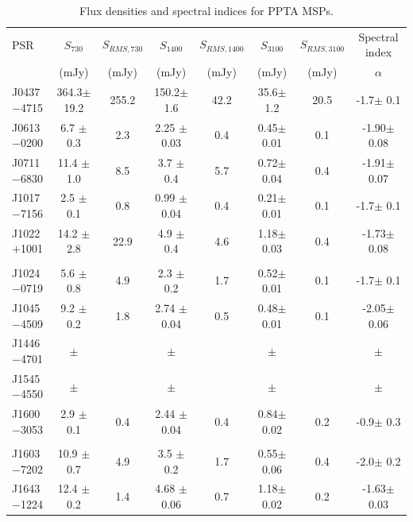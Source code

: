 \documentclass[useAMS,usenatbib]{mn2e}
\begin{document}
\begin{table}
\centering
\caption{Flux densities and spectral indices for PPTA MSPs.}
\label{tableFlux}
\begin{tabular}{lccccccc}
\hline
PSR              &    $S_{730}$   &   $S_{RMS,730}$  &    $S_{1400}$    &   $S_{RMS,1400}$  &    $S_{3100}$    &   $S_{RMS,3100}$  & Spectral index \\
								 &     (mJy)      &      (mJy)       &     (mJy)        &      (mJy)       &      (mJy)       &      (mJy)       &     $\alpha$   \\
\hline
 J0437$-$4715  &  364.3$\pm$ 19.2 &  255.2 &  150.2$\pm$ 1.6  &  42.2 &  35.6$\pm$ 1.2  &  20.5 &  -1.7$\pm$ 0.1    \\
 J0613$-$0200  &  6.7  $\pm$ 0.3  &  2.3   &  2.25 $\pm$ 0.03 &  0.4  &  0.45$\pm$ 0.01 &  0.1  &  -1.90$\pm$ 0.08    \\
 J0711$-$6830  &  11.4 $\pm$ 1.0  &  8.5   &  3.7  $\pm$ 0.4  &  5.7  &  0.72$\pm$ 0.04 &  0.4  &  -1.91$\pm$ 0.07    \\
 J1017$-$7156  &  2.5  $\pm$ 0.1  &  0.8   &  0.99 $\pm$ 0.04 &  0.4  &  0.21$\pm$ 0.01 &  0.1  &  -1.7$\pm$ 0.1    \\
 J1022$+$1001  &  14.2 $\pm$ 2.8  &  22.9  &  4.9  $\pm$ 0.4  &  4.6  &  1.18$\pm$ 0.03 &  0.4  &  -1.73$\pm$ 0.08    \\
               &	                &        &                  &       &                 &       &                 \\
 J1024$-$0719  &  5.6  $\pm$ 0.8  &  4.9   &  2.3  $\pm$ 0.2  &  1.7  &  0.52$\pm$ 0.01 &  0.1  &  -1.7$\pm$ 0.1    \\
 J1045$-$4509  &  9.2  $\pm$ 0.2  &  1.8   &  2.74 $\pm$ 0.04 &  0.5  &  0.48$\pm$ 0.01 &  0.1  &  -2.05$\pm$ 0.06    \\
 J1446$-$4701  &    $\pm$   &     &    $\pm$  &    &   $\pm$  &    &  $\pm$     \\
 J1545$-$4550  &    $\pm$   &     &    $\pm$  &    &   $\pm$  &    &  $\pm$     \\
 J1600$-$3053  &  2.9  $\pm$ 0.1  &  0.4   &  2.44 $\pm$ 0.04 &  0.4  &  0.84$\pm$ 0.02 &  0.2  &  -0.9$\pm$ 0.3    \\
               &	                &        &                  &       &                 &       &                 \\
 J1603$-$7202  &  10.9 $\pm$ 0.7  &  4.9   &  3.5  $\pm$ 0.2  &  1.7  &  0.55$\pm$ 0.06 &  0.4  &  -2.0$\pm$ 0.2    \\
 J1643$-$1224  &  12.4 $\pm$ 0.2  &  1.4   &  4.68 $\pm$ 0.06 &  0.7  &  1.18$\pm$ 0.02 &  0.2  &  -1.63$\pm$ 0.03    \\

\end{tabular}
\end{table}
\end{document}
